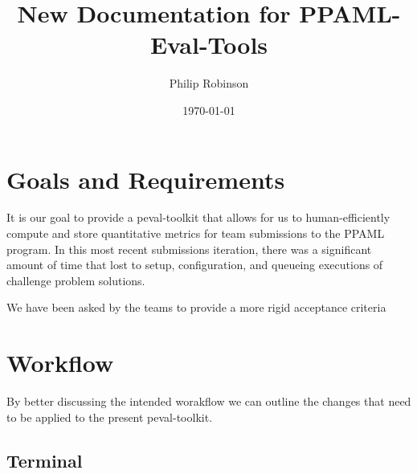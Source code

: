 \documentclass[11pt]{article} %
\title{New Documentation for PPAML-Eval-Tools}
\date{\today}
\author{Philip Robinson}
\def\ptk{peval-toolkit\xspace}
\def\ppaml{PPAML\xspace}
\begin{document}
  \maketitle

  \section*{Goals and Requirements}

  It is our goal to provide a \ptk that allows for us to human-efficiently compute and store quantitative metrics for team submissions to the \ppaml program. In this most recent submissions iteration, there was a significant amount of time that lost to setup, configuration, and queueing executions of challenge problem solutions. 

    We have been asked by the teams to provide a more rigid acceptance criteria
  
\newpage
  \section*{Workflow}
  By better discussing the intended worakflow we can outline the changes that need to be applied to the present \ptk.

  \subsection*{Terminal}
  
\end{document}
